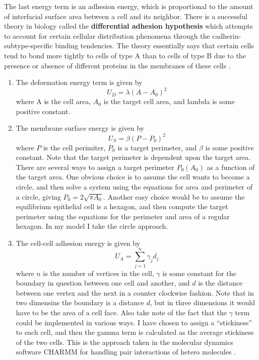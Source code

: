 The last energy term is an adhesion energy, which is proportional to the amount of interfacial surface area between a cell and its neighbor. There is a successful theory in biology called the \textbf{differential adhesion hypothesis} which attempts to account for certain cellular distribution phenomena through the cadherin-subtype-specific binding tendencies. The theory essentially says that certain cells tend to bond more tightly to cells of type A than to cells of type B due to the presence or absence of different proteins in the membranes of these cells  \cite{DA}.

\begin{enumerate}
\item The deformation energy term is given by \\ 
\begin{equation}
U_D = \lambda(A - A_0)^2
\end{equation}
 where A is the cell area, $A_0$ is the target cell area, and lambda is some positive constant.
\item The membrane surface energy is given by
\begin{equation}
U_S = \beta(P - P_0)^2
\end{equation}
 where $P$ is the cell perimiter, $P_0$ is a target perimeter, and $\beta$ is some positive constant. Note that the target perimeter is dependent upon the target area. There are several ways to assign a target perimeter $P_0(A_0)$ as a function of the target area. One obvious choice is to assume the cell wants to become a circle, and then solve a system using the equations for area and perimeter of a circle, giving $P_0 =2\sqrt{\pi A_0}$. Another easy choice would be to assume the equilibrium epithelial cell is a hexagon, and then compute the target perimeter using the equations for the perimeter and area of a regular hexagon. In my model I take the circle approach.
\item The cell-cell adhesion energy is given by
\begin{equation}U_A = \displaystyle\sum\limits_{j = 1}^{n}\gamma_{j}d_{j}\end{equation}
where $n$ is the number of vertices in the cell, $\gamma$ is some constant for the boundary in question between one cell and another, and $d$ is the distance between one vertex and the next in a counter clockwise fashion. Note that in two dimensins the boundary is a distance $d$, but in three dimensions it would have to be the area of a cell face. Also take note of the fact that the $\gamma$ term could be implemented in various ways. I have chosen to assign a ``stickiness'' to each cell, and then the gamma term is calculated as the average stickiness of the two cells. This is the approach taken in the molecular dynamics software CHARMM for handling pair interactions of hetero molecules \cite{CHARMM}.


\end{enumerate}

